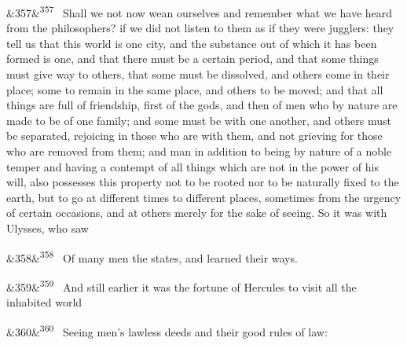 \documentclass[12pt]{article}
\newcommand{\para}[1][]{\par\noindent\ifx&#1&\else\textsuperscript{\footnotesize #1}~\fi}
\begin{document}
\para[357] Shall we not now wean ourselves and remember what we have heard from the philosophers? if we did not listen to them as if they were jugglers: they tell us that this world is one city, and the substance out of which it has been formed is one, and that there must be a certain period, and that some things must give way to others, that some must be dissolved, and others come in their place; some to remain in the same place, and others to be moved; and that all things are full of friendship, first of the gods, and then of men who by nature are made to be of one family; and some must be with one another, and others must be separated, rejoicing in those who are with them, and not grieving for those who are removed from them; and man in addition to being by nature of a noble temper and having a contempt of all things which are not in the power of his will, also possesses this property not to be rooted nor to be naturally fixed to the earth, but to go at different times to different places, sometimes from the urgency of certain occasions, and at others merely for the sake of seeing. So it was with Ulysses, who saw

\para[358] Of many men the states, and learned their ways.

\para[359] And still earlier it was the fortune of Hercules to visit all the inhabited world

\para[360] Seeing men's lawless deeds and their good rules of law:
\end{document}
